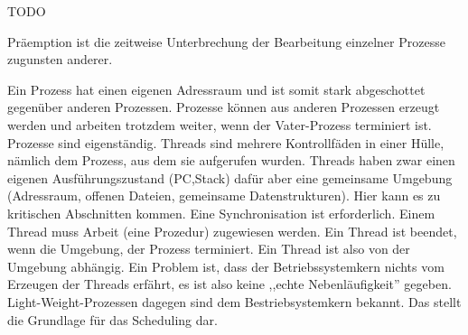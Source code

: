 \begin{answer}
TODO 
\end{answer}

\begin{answer}
Präemption ist die zeitweise Unterbrechung der Bearbeitung einzelner Prozesse zugunsten anderer.
\end{answer}

\begin{answer}
Ein Prozess hat einen eigenen Adressraum und ist somit stark abgeschottet gegenüber anderen
Prozessen. Prozesse können aus anderen Prozessen erzeugt werden und arbeiten trotzdem weiter,
wenn der Vater-Prozess terminiert ist. Prozesse sind eigenständig.
Threads sind mehrere Kontrollfäden in einer Hülle, nämlich dem Prozess, aus dem sie aufgerufen
wurden. Threads haben zwar einen eigenen Ausführungszustand (PC,Stack) dafür aber eine
gemeinsame Umgebung (Adressraum, offenen Dateien, gemeinsame Datenstrukturen). Hier kann
es zu kritischen Abschnitten kommen. Eine Synchronisation ist erforderlich. Einem Thread muss
Arbeit (eine Prozedur) zugewiesen werden. Ein Thread ist beendet, wenn die Umgebung, der Prozess
terminiert. Ein Thread ist also von der Umgebung abhängig.
Ein Problem ist, dass der Betriebssystemkern nichts vom Erzeugen der Threads erfährt, es ist also
keine ,,echte Nebenläufigkeit'' gegeben.
Light-Weight-Prozessen dagegen sind dem Bestriebsystemkern bekannt. Das stellt die Grundlage
für das Scheduling dar.
\end{answer}

